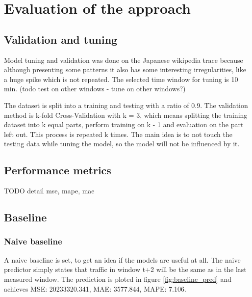 \documentclass[12pt]{article}
\begin{document}
  \section{Evaluation of the approach}
  \subsection{Validation and tuning}
  Model tuning and validation was done on the Japanese wikipedia trace because 
  although presenting some patterns it also has some interesting irregularities, 
  like a huge spike which is not repeated. The selected time window for tuning 
  is 10 min. (todo test on other windows - tune on other windows?)

  The dataset is split into a training and testing with a ratio of 0.9.
  The validation method is k-fold Cross-Validation\cite{kfold} with k = 3, 
  which means splitting the training dataset into k equal parts, perform training
  on k - 1 and evaluation on the part left out. This process is repeated k times.
  The main idea is to not touch the testing data while tuning the model, so the 
  model will not be influenced by it.

  \subsection{Performance metrics}
  TODO detail mse, mape, mae


  \subsection{Baseline}
  \subsubsection{Naive baseline}
  A naive baseline is set, to get an idea if the models are useful at all. The 
  naive predictor simply states that traffic in window t+2 will be the same as 
  in the last measured window. The prediction is ploted in figure \ref{fig:baseline_pred}
  and achieves MSE: 20233320.341, MAE: 3577.844, MAPE: 7.106.
\end{document}
